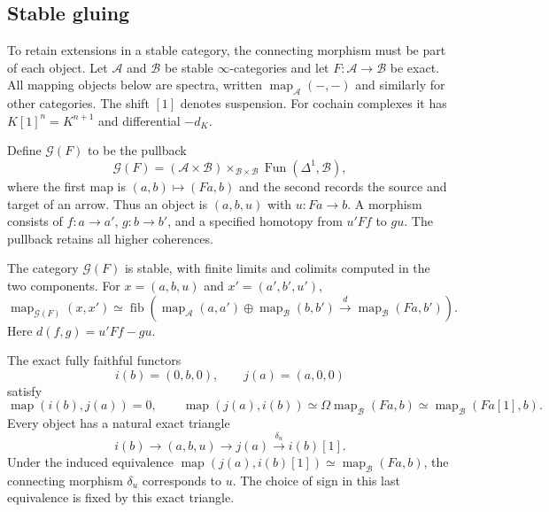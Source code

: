 \subsection{Stable gluing}

To retain extensions in a stable category, the connecting morphism must
be part of each object. Let $\mathcal A$ and $\mathcal B$ be stable
$\infty$-categories and let $F:\mathcal A\to\mathcal B$ be exact.
All mapping objects below are spectra, written
$\operatorname{map}_{\mathcal A}(-,-)$ and similarly for other categories.
The shift $[1]$ denotes suspension. For cochain complexes it has
$K[1]^n=K^{n+1}$ and differential $-d_K$.

Define $\mathcal G(F)$ to be the pullback
\[
 \mathcal G(F)
 = (\mathcal A\times\mathcal B)
   \mathop{\times}_{\mathcal B\times\mathcal B}
   \operatorname{Fun}(\Delta^1,\mathcal B),
\]
where the first map is $(a,b)\mapsto(Fa,b)$ and the second records the
source and target of an arrow. Thus an object is $(a,b,u)$ with
$u:Fa\to b$. A morphism consists of $f:a\to a'$, $g:b\to b'$, and a
specified homotopy from $u'Ff$ to $gu$. The pullback retains all higher
coherences.

\begin{proposition}
\label{v4-arith:ic:eis:extension-category}
The category $\mathcal G(F)$ is stable, with finite limits and colimits
computed in the two components. For $x=(a,b,u)$ and $x'=(a',b',u')$,
\begin{equation}\label{v4-arith:ic:eis:sector-gluing-maps}
 \operatorname{map}_{\mathcal G(F)}(x,x')
 \simeq\operatorname{fib}\left(
 \operatorname{map}_{\mathcal A}(a,a')\oplus
 \operatorname{map}_{\mathcal B}(b,b')
 \xrightarrow{\ d\ }
 \operatorname{map}_{\mathcal B}(Fa,b')\right).
\end{equation}
Here \(d(f,g)=u'Ff-gu\).

The exact fully faithful functors
\[
 i(b)=(0,b,0),\qquad j(a)=(a,0,0)
\]
satisfy
\[
 \operatorname{map}(i(b),j(a))=0,\qquad
 \operatorname{map}(j(a),i(b))
 \simeq\Omega\operatorname{map}_{\mathcal B}(Fa,b)
 \simeq\operatorname{map}_{\mathcal B}(Fa[1],b).
\]
Every object has a natural exact triangle
\[
 i(b)\longrightarrow(a,b,u)\longrightarrow j(a)
       \xrightarrow{\delta_u}i(b)[1].
\]
Under the induced equivalence
$\operatorname{map}(j(a),i(b)[1])\simeq
\operatorname{map}_{\mathcal B}(Fa,b)$, the connecting morphism
$\delta_u$ corresponds to $u$. The choice of sign in this last
equivalence is fixed by this exact triangle.
\end{proposition}

